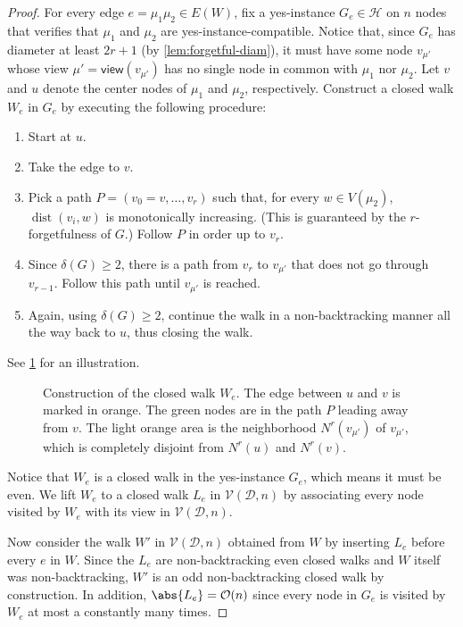\documentclass[11pt]{article}
\DeclareMathOperator{\dist}{dist}
\newcommand*{\alvgd}{\mathcal{V}(\mathcal{D},n)}
\newcommand*{\cO}{\mathcal{O}}
\newcommand*{\view}{\mathsf{view}}
\begin{document}
\begin{proof}
  For every edge $e = \mu_1\mu_2 \in E(W)$, fix a yes-instance $G_e \in
  \mathcal{H}$ on $n$ nodes that verifies that $\mu_1$ and $\mu_2$ are
  yes-instance-compatible.
  Notice that, since $G_e$ has diameter at least $2r+1$ (by
  \cref{lem:forgetful-diam}), it must have some node $v_{\mu'}$ whose view $\mu'
  = \view(v_{\mu'})$ has no single node in common with $\mu_1$ nor $\mu_2$.
  Let $v$ and $u$ denote the center nodes of $\mu_1$ and $\mu_2$, respectively.
  Construct a closed walk $W_e$ in $G_e$ by executing the following procedure:
  \begin{enumerate}
    \item Start at $u$.
    \item Take the edge to $v$.
    \item Pick a path $P = (v_0 = v, \dots, v_r)$ such that, for every $w \in
    V(\mu_2)$, $\dist(v_i,w)$ is monotonically increasing.
    (This is guaranteed by the $r$-forgetfulness of $G$.)
    Follow $P$ in order up to $v_r$.
    \item Since $\delta(G) \ge 2$, there is a path from $v_r$ to $v_{\mu'}$ that
    does not go through $v_{r-1}$.
    Follow this path until $v_{\mu'}$ is reached.
    \item Again, using $\delta(G) \ge 2$, continue the walk in a
    non-backtracking manner all the way back to $u$, thus closing the walk.
  \end{enumerate}
  See \cref{fig:odd-walk-realizability} for an illustration.
  \begin{figure}
    \centering
    
    \caption{Construction of the closed walk $W_e$.
      The edge between $u$ and $v$ is marked in orange.
      The green nodes are in the path $P$ leading away from $v$.
      The light orange area is the neighborhood $N^r(v_{\mu'})$ of $v_{\mu'}$,
      which is completely disjoint from $N^r(u)$ and $N^r(v)$.}
    \label{fig:odd-walk-realizability}
  \end{figure}
  Notice that $W_e$ is a closed walk in the yes-instance $G_e$, which means it
  must be even.
  We lift $W_e$ to a closed walk $L_e$ in $\alvgd$ by associating every node
  visited by $W_e$ with its view in $\alvgd$.

  Now consider the walk $W'$ in $\alvgd$ obtained from $W$ by inserting $L_e$
  before every $e$ in $W$.
  Since the $L_e$ are non-backtracking even closed walks and $W$ itself was
  non-backtracking, $W'$ is an odd non-backtracking closed walk by construction.
  In addition, $\abs{L_e} = \cO(n)$ since every node in $G_e$ is visited by
  $W_e$ at most a constantly many times.


\end{proof}
\end{document}
